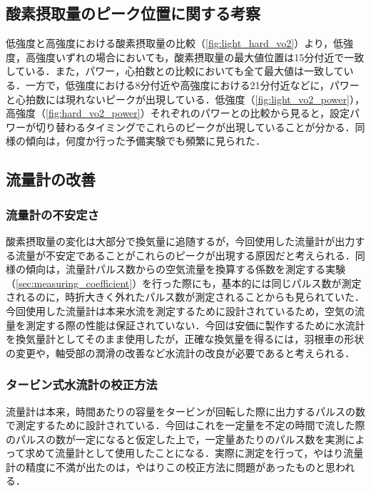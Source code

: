 \subsection{酸素摂取量のピーク位置に関する考察}

低強度と高強度における酸素摂取量の比較（\ref{fig:light_hard_vo2}）より，低強度，高強度いずれの場合においても，酸素摂取量の最大値位置は15分付近で一致している．また，パワー，心拍数との比較においても全て最大値は一致している．一方で，低強度における8分付近や高強度における21分付近などに，パワーと心拍数には現れないピークが出現している．低強度（\ref{fig:light_vo2_power}），高強度（\ref{fig:hard_vo2_power}）それぞれのパワーとの比較から見ると，設定パワーが切り替わるタイミングでこれらのピークが出現していることが分かる．同様の傾向は，何度か行った予備実験でも頻繁に見られた．

\subsection{流量計の改善}

\subsubsection{流量計の不安定さ}

酸素摂取量の変化は大部分で換気量に追随するが，今回使用した流量計が出力する流量が不安定であることがこれらのピークが出現する原因だと考えられる．同様の傾向は，流量計パルス数からの空気流量を換算する係数を測定する実験（\ref{sec:measuring_coefficient}）を行った際にも，基本的には同じパルス数が測定されるのに，時折大きく外れたパルス数が測定されることからも見られていた．今回使用した流量計は本来水流を測定するために設計されているため，空気の流量を測定する際の性能は保証されていない．今回は安価に製作するために水流計を換気量計としてそのまま使用したが，正確な換気量を得るには，羽根車の形状の変更や，軸受部の潤滑の改善など水流計の改良が必要であると考えられる．

\subsubsection{タービン式水流計の校正方法}

流量計は本来，時間あたりの容量をタービンが回転した際に出力するパルスの数で測定するために設計されている．今回はこれを一定量を不定の時間で流した際のパルスの数が一定になると仮定した上で，一定量あたりのパルス数を実測によって求めて流量計として使用したことになる．実際に測定を行って，やはり流量計の精度に不満が出たのは，やはりこの校正方法に問題があったものと思われる．

